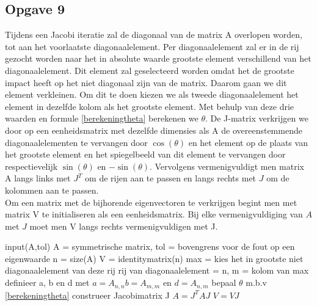 \documentclass[a4paper, 12pt, titlepage]{report}
\begin{document}
\subsection{Opgave 9}
Tijdens een Jacobi iteratie zal de diagonaal van de matrix A overlopen worden, tot aan het voorlaatste diagonaalelement. Per diagonaalelement zal er in de rij gezocht worden naar het in absolute waarde grootste element verschillend van het diagonaalelement. Dit element zal geselecteerd worden omdat het de grootste impact heeft op het niet diagonaal zijn van de matrix. Daarom gaan we dit element verkleinen. Om dit te doen kiezen we als tweede diagonaalelement het element in dezelfde kolom als het grootste element. Met behulp van deze drie waarden en formule \eqref{berekeningtheta} berekenen we $\theta$. De J-matrix verkrijgen we door op een eenheidsmatrix met dezelfde dimensies als A  de overeenstemmende diagonaalelementen te vervangen door $\cos(\theta)$ en het element op de plaats van het grootste element en het spiegelbeeld van dit element te vervangen door respectievelijk $\sin(\theta)$ en $-\sin(\theta)$. Vervolgens vermenigvuldigt men matrix A langs links met $J^T$ om de rijen aan te passen en langs rechts met $J$ om de kolommen aan te passen.\\
Om een matrix met de bijhorende eigenvectoren te verkrijgen begint men met matrix V te initialiseren als een eenheidsmatrix. Bij elke vermenigvuldiging van $A$ met $J$ moet men V langs rechts vermenigvuldigen met J.\\

\begin{algorithmic}
 \STATE input(A,tol)  A = symmetrische matrix, tol = bovengrens voor de fout op een eigenwaarde 
 \STATE n = size(A)
 \STATE V = identitymatrix(n)
 \STATE 		max = kies het in grootste niet diagonaalelement van deze rij
 \STATE rij van diagonaalelement = n, m = kolom van max
 \STATE definieer a, b en d met $a=A_{n,n} b = A_{m,m}$ en $d = A_{n,m}$
 \STATE bepaal $\theta$ m.b.v \eqref{berekeningtheta}
 \STATE construeer Jacobimatrix J 
 \STATE $A = J^TAJ$
 \STATE $V = VJ $
	\ENDFOR
\ENDWHILE
\end{algorithmic}
\end{document}

